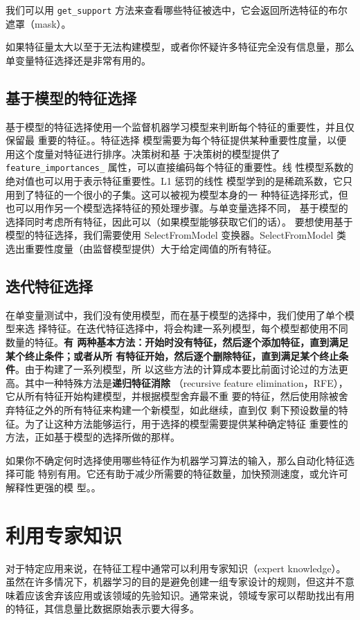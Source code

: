 我们可以用 \verb|get_support| 方法来查看哪些特征被选中，它会返回所选特征的布尔遮罩（mask）。

如果特征量太大以至于无法构建模型，或者你怀疑许多特征完全没有信息量，那么单变量特征选择还是非常有用的。
\subsection{基于模型的特征选择}
基于模型的特征选择使用一个监督机器学习模型来判断每个特征的重要性，并且仅保留最
重要的特征。。特征选择
模型需要为每个特征提供某种重要性度量，以便用这个度量对特征进行排序。决策树和基
于决策树的模型提供了 \verb|feature_importances_| 属性，可以直接编码每个特征的重要性。线
性模型系数的绝对值也可以用于表示特征重要性。L1 惩罚的线性
模型学到的是稀疏系数，它只用到了特征的一个很小的子集。这可以被视为模型本身的一
种特征选择形式，但也可以用作另一个模型选择特征的预处理步骤。与单变量选择不同，
基于模型的选择同时考虑所有特征，因此可以（如果模型能够获取它们的话）。
要想使用基于模型的特征选择，我们需要使用 SelectFromModel 变换器。SelectFromModel 类选出重要性度量（由监督模型提供）大于给定阈值的所有特征。
\subsection{迭代特征选择}
在单变量测试中，我们没有使用模型，而在基于模型的选择中，我们使用了单个模型来选
择特征。在迭代特征选择中，将会构建一系列模型，每个模型都使用不同数量的特征。\textbf{有
    两种基本方法：开始时没有特征，然后逐个添加特征，直到满足某个终止条件；或者从所
    有特征开始，然后逐个删除特征，直到满足某个终止条件}。由于构建了一系列模型，所
以这些方法的计算成本要比前面讨论过的方法更高。其中一种特殊方法是\textbf{递归特征消除}
（recursive feature elimination，RFE），它从所有特征开始构建模型，并根据模型舍弃最不重
要的特征，然后使用除被舍弃特征之外的所有特征来构建一个新模型，如此继续，直到仅
剩下预设数量的特征。为了让这种方法能够运行，用于选择的模型需要提供某种确定特征
重要性的方法，正如基于模型的选择所做的那样。

如果你不确定何时选择使用哪些特征作为机器学习算法的输入，那么自动化特征选择可能
特别有用。它还有助于减少所需要的特征数量，加快预测速度，或允许可解释性更强的模
型。。
\section{利用专家知识}
对于特定应用来说，在特征工程中通常可以利用专家知识（expert knowledge）。虽然在许多情况下，机器学习的目的是避免创建一组专家设计的规则，但这并不意味着应该舍弃该应用或该领域的先验知识。通常来说，领域专家可以帮助找出有用的特征，其信息量比数据原始表示要大得多。

